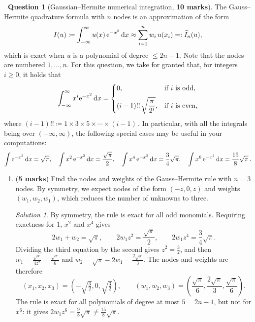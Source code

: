 \documentclass[10pt]{article}
\theoremstyle{definition}
\newtheorem{question}{{\normalfont \faGears}~Question}
\theoremstyle{remark}
\newtheorem*{protosolution}{Solution}
\renewcommand{\mymarks}[1]{\textbf{#1 marks}}
\newenvironment{solutionframe}
{%
    \begin{mdframed}[
        leftmargin=1cm,
        skipabove=.3cm,
        linecolor=blue,
        backgroundcolor=lightgreen,
        linewidth=0pt,
        innerleftmargin=.5em,
        innerrightmargin=.5em,
        innertopmargin=.3em,
        innerbottommargin=.6em,
    ]
}
{
    \end{mdframed}
}
\newenvironment{solution}
{\pushQED{\qed}\renewcommand{\qedsymbol}{$\triangle$}
\begin{solutionframe}\small \begin{protosolution}}
{\popQED\end{protosolution}\end{solutionframe}}
\begin{document}
\begin{question}
    [Gaussian--Hermite numerical integration, \mymarks{10}]

The Gauss--Hermite quadrature formula with \(n\) nodes is an approximation of the form
\[
I(u) \coloneq \int_{-\infty}^{\infty} u(x)\, \mathrm e^{-x^{2}} \, \mathrm d x \approx \sum_{i=1}^n w_i\,u(x_i)=:\widehat I_n(u),
\]
which is exact when \(u\) is a polynomial of degree \(\le 2n-1\).
Note that the nodes are numbered \(1,\dots,n\).
For this question, we take for granted that, for integers \(i\ge 0\),
it holds that
\[
    \int_{-\infty}^{\infty} x^{i} \mathrm e^{-x^{2}}\, \mathrm d x =
    \begin{cases}
        \displaystyle
        0, & \text{if $i$ is odd},\\[2mm]
        \displaystyle
        (i-1)!! \, \sqrt{\frac{\pi}{2^i}}, & \text{if $i$ is even},
    \end{cases}
\]
where
\(
    (i-1)!! \coloneq 1 \times 3 \times 5 \times \cdots \times (i-1) \, .
\)
In particular, with all the integrals being over $(-\infty, \infty)$,
the following special cases may be useful in your computations:
\[
    \int \mathrm e^{-x^{2}}\, \mathrm d x = \sqrt{\pi}, \quad
    \int x^2 \, \mathrm e^{-x^{2}}\, \mathrm d x = \frac{\sqrt{\pi}}{2}, \quad
    \int x^4 \, \mathrm e^{-x^{2}}\, \mathrm d x = \frac{3}{4} \sqrt{\pi}, \quad
    \int x^6 \, \mathrm e^{-x^{2}}\, \mathrm d x = \frac{15}{8} \sqrt{\pi}\, .
\]

\begin{enumerate}
\item (\mymarks{5})
Find the nodes and weights of the Gauss--Hermite rule with \(n=3\) nodes.
By symmetry,
we expect nodes of the form $(-z,0,z)$ and weights $(w_1,w_2,w_1)$,
which reduces the number of unknowns to three.

\begin{solution}
    By symmetry, the rule is exact for all odd monomials.
    Requiring exactness for $1$, $x^2$ and $x^4$ gives
    \[
        2 w_1 + w_2 = \sqrt{\pi},
        \qquad
        2 w_1 z^2 = \frac{\sqrt{\pi}}{2},
        \qquad
        2 w_1 z^4 = \frac{3}{4} \sqrt{\pi}.
    \]
    Dividing the third equation by the second gives $z^2 = \frac{3}{2}$,
    and then $w_1 = \frac{\sqrt{\pi}}{4 z^2} = \frac{\sqrt{\pi}}{6}$ and $w_2 = \sqrt{\pi} - 2 w_1 = \frac{2\sqrt{\pi}}{3}$.
    The nodes and weights are therefore
    \[
        (x_1, x_2, x_3) = \left(-\sqrt{\tfrac{3}{2}}, 0, \sqrt{\tfrac{3}{2}}\right),
        \qquad
        (w_1, w_2, w_3) = \left(\frac{\sqrt{\pi}}{6}, \frac{2\sqrt{\pi}}{3}, \frac{\sqrt{\pi}}{6}\right).
    \]
    The rule is exact for all polynomials of degree at most $5 = 2n - 1$, but not for $x^6$:
    it gives $2 w_1 z^6 = \frac{9}{8} \sqrt{\pi} \neq \frac{15}{8} \sqrt{\pi}$.
\end{solution}


\end{enumerate}
\end{question}
\end{document}
